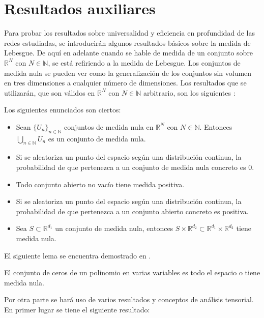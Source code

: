 \section{Resultados auxiliares}

Para probar los resultados sobre universalidad y eficiencia en profundidad de las redes estudiadas, se introducirán algunos resultados básicos sobre la medida de Lebesgue. De aquí en adelante cuando se hable de medida de un conjunto sobre $\mathbb{R}^N$ con $N\in\mathbb{N}$, se está refiriendo a la medida de Lebesgue. Los conjuntos de medida nula se pueden ver como la generalización de los conjuntos sin volumen en tres dimensiones a cualquier número de dimensiones. Los resultados que se utilizarán, que son válidos en $\mathbb{R}^N$ con $N\in\mathbb{N}$ arbitrario, son los siguientes :

\begin{lema}\label{lem:compilacionLemas}
Los siguientes enunciados son ciertos:

\begin{itemize}
\item Sean $\{U_n\}_{n\in\mathbb{N}}$ conjuntos de medida nula en $\mathbb{R}^N$ con $N\in\mathbb{N}$. Entonces $\bigcup_{n\in\mathbb{N}} U_n$ es un conjunto de medida nula. 
\item Si se aleatoriza un punto del espacio según una distribución continua, la probabilidad de que pertenezca a un conjunto de medida nula concreto es $0$.
\item Todo conjunto abierto no vacío tiene medida positiva.
\item Si se aleatoriza un punto del espacio según una distribución continua, la probabilidad de que pertenezca a un conjunto abierto concreto es positiva.
\item Sea $S\subset \mathbb{R}^{d_1}$ un conjunto de medida nula, entonces $S\times \mathbb{R}^{d_2} \subset \mathbb{R}^{d_1}\times \mathbb{R}^{d_2}$ tiene medida nula.
\end{itemize}
\end{lema}


El siguiente lema se encuentra demostrado en \cite{polinomio}.

\begin{lema} \label{lem:ceroPolinomio}
El conjunto de ceros de un polinomio en varias variables es todo el espacio o tiene medida nula.
\end{lema}

Por otra parte se hará uso de varios resultados y conceptos de análisis tensorial. En primer lugar se tiene el siguiente resultado:

